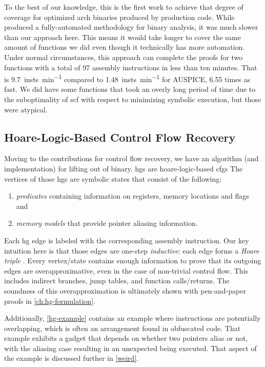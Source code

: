 To the best of our knowledge, this is the first work to achieve that degree of coverage for optimized \gls{arch} binaries produced by production code.
While \textcite{tan2015auspice} produced a fully-automated methodology for binary analysis, it was much slower than our approach here.
This means it would take longer to cover the same amount of functions we did even though it technically has more automation.
Under normal circumstances, this approach can complete the proofs for two functions with a total of \num{97} assembly instructions in less than ten minutes.
That is \SI{9.7}{insts\per\minute} compared to \SI{1.48}{insts\per\minute} for AUSPICE, \num{6.55} times as fast.
We did have some functions that took an overly long period of time due to the suboptimality of \acl*{scf} with respect to minimizing symbolic execution, but those were atypical.

\subsection{Hoare-Logic-Based Control Flow Recovery}
Moving to the contributions for control flow recovery, we have an algorithm (and implementation) for lifting  out of  binary.
\Acp{hg} are \gls{hoare-logic}-based \acp{cfg}
The vertices of those \acp{hg} are symbolic states that consist of the following:
\begin{enumerate}
  \item \emph{predicates} containing information on registers, memory locations and flags and
  \item \emph{memory models} that provide pointer aliasing information.
\end{enumerate}
Each \ac{hg} edge is labeled with the corresponding assembly instruction.
Our key intuition here is that those edges are one-step \emph{inductive}:
each edge forms a \emph{Hoare triple}
\autocite{hoare1969axiomatic}.
Every vertex/state contains enough information to prove that its outgoing edges are overapproximative,
even in the case of non-trivial control flow.
This includes indirect branches, jump tables, and function calls/returns.
The soundness of this overapproximation is ultimately shown with pen-and-paper proofs in \cref{ch:hg-formulation}.

Additionally, \cref{hg-example} contains an example where instructions are potentially overlapping, which is often an arrangement found in obfuscated code.
That example exhibits a  gadget that depends on whether two pointers alias or not, with the aliasing case resulting in an unexpected  being executed. That aspect of the example is discussed further in \cref{weird}.

